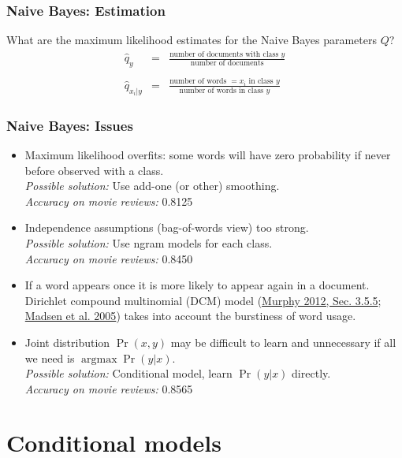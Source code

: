 \documentclass[ignorenonframetext,plain]{beamer}
\DeclareMathOperator*{\argmax}{argmax}
\begin{document}
\begin{frame}\frametitle{Naive Bayes: Estimation}
What are the maximum likelihood estimates for the Naive Bayes
parameters $Q$?\begin{eqnarray*}
\hat{q}_y &=& \frac{\mbox{number of documents with class
    $y$}}{\mbox{number of documents}}\\
\\
\hat{q}_{x_i|y} &=& \frac{\mbox{number of words $=x_i$ in class
    $y$}}{\mbox{number of words in class $y$}}
\end{eqnarray*}  
\end{frame}

\begin{frame}\frametitle{Naive Bayes: Issues}
\begin{itemize}
\item Maximum likelihood overfits: some words will have zero
  probability if never before observed with a class.
  \\ \textsl{Possible solution:} Use add-one (or other) smoothing.
  \\ \textsl{Accuracy on movie reviews:} 0.8125
\item Independence assumptions (bag-of-words view) too strong.
  \\ \textsl{Possible solution:} Use ngram models for each class.
  \\ \textsl{Accuracy on movie reviews:} 0.8450 
\item If a word appears once it is more likely to appear again in a
  document.  Dirichlet compound multinomial (DCM) model
  (\href{http://www.cs.ubc.ca/~murphyk/MLbook} {Murphy 2012,
    Sec. 3.5.5};
  \href{http://eprints.pascal-network.org/archive/00001454/01/dcmnbV10.1.pdf}
       {Madsen et al. 2005}) takes into account the burstiness of word
       usage.
\item Joint distribution $\Pr(x,y)$ may be difficult to learn and
  unnecessary if all we need is $\argmax\Pr(y|x)$.
  \\ \textsl{Possible solution:} Conditional model, learn
  $\Pr(y|x)$ directly.
  \\ \textsl{Accuracy on movie reviews:} 0.8565
\end{itemize}
\end{frame}

\section{Conditional models}
\frame{\sectionpage}
\end{document}
